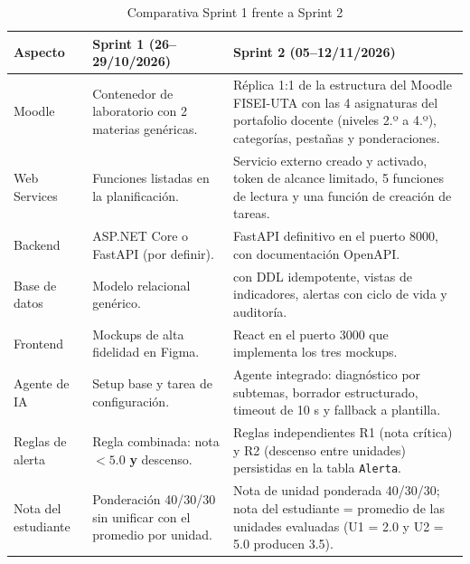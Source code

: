 \documentclass[11pt,a4paper]{article}
\newcommand{\hd}[1]{\textbf{#1}}
\begin{document}
\begin{table}[H]
\centering\small
\caption{Comparativa Sprint 1 frente a Sprint 2}
\begin{tabularx}{\textwidth}{|R{3.0cm}|Y|Y|}
\hline
\hd{Aspecto} & \hd{Sprint 1 (26--29/10/2026)} & \hd{Sprint 2 (05--12/11/2026)}\\ \hline
Moodle & Contenedor de laboratorio con 2 materias genéricas. & Réplica 1:1 de la estructura del Moodle FISEI-UTA con las 4 asignaturas del portafolio docente (niveles 2.º a 4.º), categorías, pestañas y ponderaciones.\\ \hline
Web Services & Funciones listadas en la planificación. & Servicio externo creado y activado, token de alcance limitado, 5 funciones de lectura y una función de creación de tareas.\\ \hline
Backend & ASP.NET Core o FastAPI (por definir). & FastAPI definitivo en el puerto 8000, con documentación OpenAPI.\\ \hline
Base de datos & Modelo relacional genérico. &  con DDL idempotente, vistas de indicadores, alertas con ciclo de vida y auditoría.\\ \hline
Frontend & Mockups de alta fidelidad en Figma. & React en el puerto 3000 que implementa los tres mockups.\\ \hline
Agente de IA & Setup base y tarea de configuración. & Agente integrado: diagnóstico por subtemas, borrador estructurado, timeout de 10 s y fallback a plantilla.\\ \hline
Reglas de alerta & Regla combinada: nota $<5.0$ \textbf{y} descenso. & Reglas independientes R1 (nota crítica) y R2 (descenso entre unidades) persistidas en la tabla \texttt{Alerta}.\\ \hline
Nota del estudiante & Ponderación 40/30/30 sin unificar con el promedio por unidad. & Nota de unidad ponderada 40/30/30; nota del estudiante = promedio de las unidades evaluadas (U1 = 2.0 y U2 = 5.0 producen 3.5).\\ \hline
\end{tabularx}
\end{table}
\end{document}
